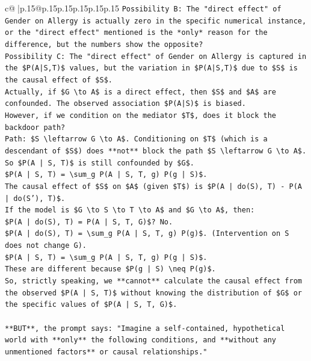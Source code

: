 \documentclass{article}
\begin{document}
{\begin{supertabular}{c@{$\;$}|p{.15\linewidth}@{}p{.15\linewidth}p{.15\linewidth}p{.15\linewidth}p{.15\linewidth}p{.15\linewidth}}
{{{\texttt{Possibility B: The "direct effect" of Gender on Allergy is actually zero in the specific numerical instance, or the "direct effect" mentioned is the *only* reason for the difference, but the numbers show the opposite?} \\
\texttt{Possibility C: The "direct effect" of Gender on Allergy is captured in the \$P(A|S,T)\$ values, but the variation in \$P(A|S,T)\$ due to \$S\$ is the causal effect of \$S\$.} \\
\texttt{Actually, if \$G \textbackslash{}to A\$ is a direct effect, then \$S\$ and \$A\$ are confounded. The observed association \$P(A|S)\$ is biased.} \\
\texttt{However, if we condition on the mediator \$T\$, does it block the backdoor path?} \\
\texttt{Path: \$S \textbackslash{}leftarrow G \textbackslash{}to A\$. Conditioning on \$T\$ (which is a descendant of \$S\$) does **not** block the path \$S \textbackslash{}leftarrow G \textbackslash{}to A\$.} \\
\texttt{So \$P(A | S, T)\$ is still confounded by \$G\$.} \\
\texttt{\$P(A | S, T) = \textbackslash{}sum\_g P(A | S, T, g) P(g | S)\$.} \\
\texttt{The causal effect of \$S\$ on \$A\$ (given \$T\$) is \$P(A | do(S), T) {-} P(A | do(S'), T)\$.} \\
\texttt{If the model is \$G \textbackslash{}to S \textbackslash{}to T \textbackslash{}to A\$ and \$G \textbackslash{}to A\$, then:} \\
\texttt{\$P(A | do(S), T) = P(A | S, T, G)\$? No.} \\
\texttt{\$P(A | do(S), T) = \textbackslash{}sum\_g P(A | S, T, g) P(g)\$. (Intervention on S does not change G).} \\
\texttt{\$P(A | S, T) = \textbackslash{}sum\_g P(A | S, T, g) P(g | S)\$.} \\
\texttt{These are different because \$P(g | S) \textbackslash{}neq P(g)\$.} \\
\texttt{So, strictly speaking, we **cannot** calculate the causal effect from the observed \$P(A | S, T)\$ without knowing the distribution of \$G\$ or the specific values of \$P(A | S, T, G)\$.} \\
\\ 
\texttt{**BUT**, the prompt says: "Imagine a self{-}contained, hypothetical world with **only** the following conditions, and **without any unmentioned factors** or causal relationships."} \\
}}}
\end{supertabular}}
\end{document}
